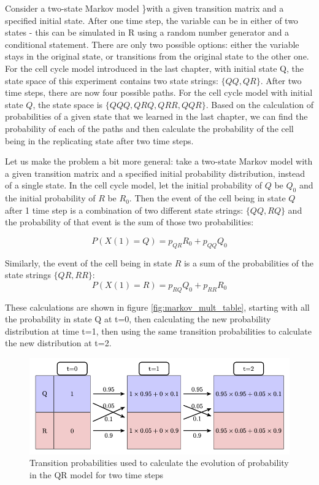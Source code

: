 \documentclass[
  letterpaper,
  DIV=11,
  numbers=noendperiod]{scrreprt}
\begin{document}
\label{sec:math11}

Consider a two-state Markov model \}with a given transition matrix and a
specified initial state. After one time step, the variable can be in
either of two states - this can be simulated in R using a random number
generator and a conditional statement. There are only two possible
options: either the variable stays in the original state, or transitions
from the original state to the other one. For the cell cycle model
introduced in the last chapter, with initial state Q, the state space of
this experiment contains two state strings: \(\{QQ, QR\}\). After two
time steps, there are now four possible paths. For the cell cycle model
with initial state \(Q\), the state space is \(\{QQQ, QRQ, QRR, QQR\}\).
Based on the calculation of probabilities of a given state that we
learned in the last chapter, we can find the probability of each of the
paths and then calculate the probability of the cell being in the
replicating state after two time steps.

Let us make the problem a bit more general: take a two-state Markov
model with a given transition matrix and a specified initial probability
distribution, instead of a single state. In the cell cycle model, let
the initial probability of \(Q\) be \(Q_0\) and the initial probability
of \(R\) be \(R_0\). Then the event of the cell being in state \(Q\)
after 1 time step is a combination of two different state strings:
\(\{QQ, RQ\}\) and the probability of that event is the sum of those two
probabilities:

\[ 
P(X(1) = Q)  = p_{QR}R_0 + p_{QQ}Q_0  
\]

Similarly, the event of the cell being in state \(R\) is a sum of the
probabilities of the state strings \(\{QR, RR\}\): \[ 
P(X(1) = R) = p_{RQ}Q_0 + p_{RR}R_0 
\]

These calculations are shown in figure \ref{fig:markov_mult_table},
starting with all the probability in state Q at t=0, then calculating
the new probability distribution at time t=1, then using the same
transition probabilities to calculate the new distribution at t=2.

\begin{figure}

{\centering \includegraphics{./ch11/markov_table.png}

}

\caption{Transition probabilities used to calculate the evolution of
probability in the QR model for two time steps}

\end{figure}
\end{document}
